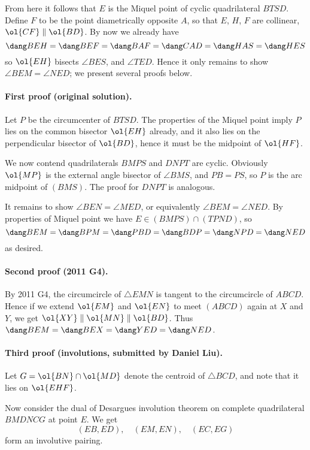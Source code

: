 \documentclass[11pt]{scrartcl}
\begin{document}
From here it follows that $E$ is the Miquel point of
cyclic quadrilateral $BTSD$.
Define $F$ to be the point diametrically opposite $A$,
so that $E$, $H$, $F$ are collinear, $\ol{CF} \parallel \ol{BD}$.
By now we already have
\[ \dang BEH = \dang BEF = \dang BAF = \dang CAD = \dang HAS = \dang HES \]
so $\ol{EH}$ bisects $\angle BES$, and $\angle TED$.
Hence it only remains to show $\angle BEM = \angle NED$;
we present several proofs below.

\paragraph{First proof (original solution).}
Let $P$ be the circumcenter of $BTSD$.
The properties of the Miquel point imply $P$ lies on
the common bisector $\ol{EH}$ already,
and it also lies on the perpendicular bisector of $\ol{BD}$,
hence it must be the midpoint of $\ol{HF}$.

We now contend quadrilaterals $BMPS$ and $DNPT$ are cyclic.
Obviously $\ol{MP}$ is the external angle bisector of $\angle BMS$,
and $PB = PS$, so $P$ is the arc midpoint of $(BMS)$.
The proof for $DNPT$ is analogous.

It remains to show $\angle BEN = \angle MED$,
or equivalently $\angle BEM = \angle NED$.
By properties of Miquel point we have $E \in (BMPS) \cap (TPND)$, so
\[ \dang BEM = \dang BPM = \dang PBD = \dang BDP = \dang NPD = \dang NED \]
as desired.

\paragraph{Second proof (2011 G4).}
By 2011 G4, the circumcircle of $\triangle EMN$
is tangent to the circumcircle of $ABCD$.
Hence if we extend $\ol{EM}$ and $\ol{EN}$ to meet $(ABCD)$
again at $X$ and $Y$, we get $\ol{XY} \parallel \ol{MN} \parallel \ol{BD}$.
Thus $\dang BEM = \dang BEX = \dang YED = \dang NED$.

\paragraph{Third proof (involutions, submitted by Daniel Liu).}
Let $G = \ol{BN} \cap \ol{MD}$ denote the centroid of $\triangle BCD$,
and note that it lies on $\ol{EHF}$.

Now consider the dual of Desargues involution theorem on complete
quadrilateral $BMDNCG$ at point $E$.
We get
\[ (EB,ED), \quad (EM,EN), \quad (EC,EG) \]
form an involutive pairing.
\end{document}
